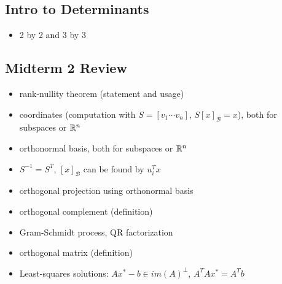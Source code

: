 \documentclass[12pt,a4paper]{article}
\def\R{\ifmmode\mathbb R\fi}
\begin{document}
\subsection*{Intro to Determinants}
\begin{itemize}
    \item 2 by 2 and 3 by 3
\end{itemize}

\subsection*{Midterm 2 Review}
\begin{itemize}
    \item rank-nullity theorem (statement and usage)
    \item coordinates (computation with $S = [v_1 \cdots v_n]$, $S[x]_{\mathcal B} = x$), both for subspaces or $\R^n$
    \item orthonormal basis, both for subspaces or $\R^n$
    \item $S^{-1} = S^T$, \therefore $[x]_{\mathcal B}$ can be found by $u_i^Tx$
    \item orthogonal projection using orthonormal basis
    \item orthogonal complement (definition)
    \item Gram-Schmidt process, QR factorization
    \item orthogonal matrix (definition)
    \item Least-squares solutions: $Ax^\ast -b \in im(A)^\perp$, $A^TAx^\ast = A^Tb$
\end{itemize}
\end{document}
